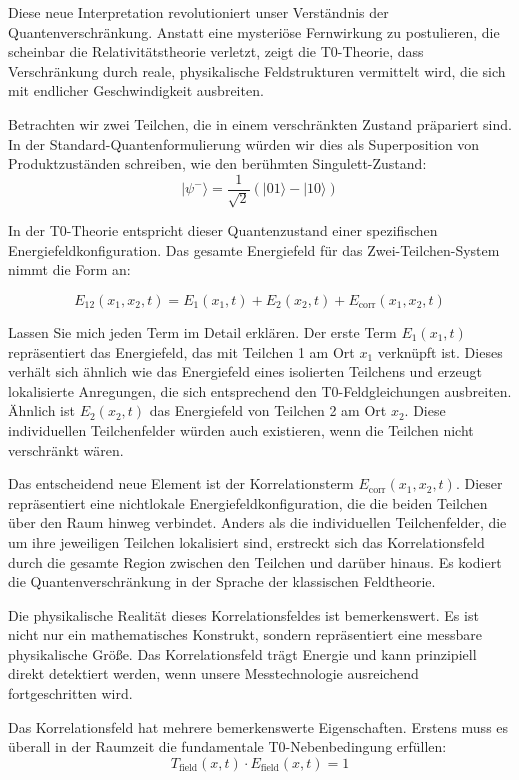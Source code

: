 \documentclass[12pt,a4paper]{article}
\theoremstyle{definition}
\theoremstyle{remark}
\begin{document}
Diese neue Interpretation revolutioniert unser Verständnis der Quantenverschränkung. Anstatt eine mysteriöse Fernwirkung zu postulieren, die scheinbar die Relativitätstheorie verletzt, zeigt die T0-Theorie, dass Verschränkung durch reale, physikalische Feldstrukturen vermittelt wird, die sich mit endlicher Geschwindigkeit ausbreiten.

Betrachten wir zwei Teilchen, die in einem verschränkten Zustand präpariert sind. In der Standard-Quantenformulierung würden wir dies als Superposition von Produktzuständen schreiben, wie den berühmten Singulett-Zustand:
$$|\psi^-\rangle = \frac{1}{\sqrt{2}}(|01\rangle - |10\rangle)$$

In der T0-Theorie entspricht dieser Quantenzustand einer spezifischen Energiefeldkonfiguration. Das gesamte Energiefeld für das Zwei-Teilchen-System nimmt die Form an:

\begin{equation}
	E_{12}(x_1,x_2,t) = E_1(x_1,t) + E_2(x_2,t) + E_{\text{corr}}(x_1,x_2,t)
	\label{eq:entangled_energy}
\end{equation}

Lassen Sie mich jeden Term im Detail erklären. Der erste Term $E_1(x_1,t)$ repräsentiert das Energiefeld, das mit Teilchen 1 am Ort $x_1$ verknüpft ist. Dieses verhält sich ähnlich wie das Energiefeld eines isolierten Teilchens und erzeugt lokalisierte Anregungen, die sich entsprechend den T0-Feldgleichungen ausbreiten. Ähnlich ist $E_2(x_2,t)$ das Energiefeld von Teilchen 2 am Ort $x_2$. Diese individuellen Teilchenfelder würden auch existieren, wenn die Teilchen nicht verschränkt wären.

Das entscheidend neue Element ist der Korrelationsterm $E_{\text{corr}}(x_1,x_2,t)$. Dieser repräsentiert eine nichtlokale Energiefeldkonfiguration, die die beiden Teilchen über den Raum hinweg verbindet. Anders als die individuellen Teilchenfelder, die um ihre jeweiligen Teilchen lokalisiert sind, erstreckt sich das Korrelationsfeld durch die gesamte Region zwischen den Teilchen und darüber hinaus. Es kodiert die Quantenverschränkung in der Sprache der klassischen Feldtheorie.

Die physikalische Realität dieses Korrelationsfeldes ist bemerkenswert. Es ist nicht nur ein mathematisches Konstrukt, sondern repräsentiert eine messbare physikalische Größe. Das Korrelationsfeld trägt Energie und kann prinzipiell direkt detektiert werden, wenn unsere Messtechnologie ausreichend fortgeschritten wird.

Das Korrelationsfeld hat mehrere bemerkenswerte Eigenschaften. Erstens muss es überall in der Raumzeit die fundamentale T0-Nebenbedingung erfüllen:
$$T_{\text{field}}(x,t) \cdot E_{\text{field}}(x,t) = 1$$
\end{document}
